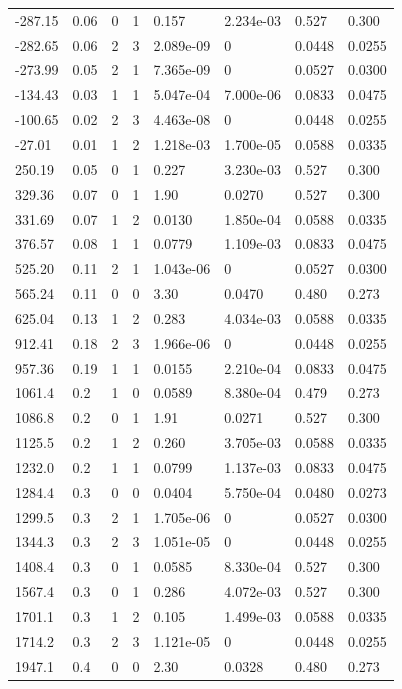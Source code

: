 \documentclass[preview]{standalone}
\begin{document}
{{\begin{tabular}{L{1.2cm}C{1.2cm} C{0.3cm}C{0.5cm} C{1.4cm}C{1.4cm} C{1.4cm}C{1.4cm}}
  -287.15  &  0.06  & 0     &  1 &  0.157  & 2.234e-03  & 0.527 &  0.300   \\ 
  -282.65  &  0.06  & 2     &  3 &  2.089e-09  & 0  & 0.0448 &  0.0255   \\ 
  -273.99  &  0.05  & 2     &  1 &  7.365e-09  & 0  & 0.0527 &  0.0300   \\ 
  -134.43  &  0.03  & 1     &  1 &  5.047e-04  & 7.000e-06  & 0.0833 &  0.0475   \\ 
  -100.65  &  0.02  & 2     &  3 &  4.463e-08  & 0  & 0.0448 &  0.0255   \\ 
  -27.01  &  0.01  & 1     &  2 &  1.218e-03  & 1.700e-05  & 0.0588 &  0.0335   \\ 
  250.19  &  0.05  & 0     &  1 &  0.227  & 3.230e-03  & 0.527 &  0.300   \\ 
  329.36  &  0.07  & 0     &  1 &  1.90  & 0.0270  & 0.527 &  0.300   \\ 
  331.69  &  0.07  & 1     &  2 &  0.0130  & 1.850e-04  & 0.0588 &  0.0335   \\ 
  376.57  &  0.08  & 1     &  1 &  0.0779  & 1.109e-03  & 0.0833 &  0.0475   \\ 
  525.20  &  0.11  & 2     &  1 &  1.043e-06  & 0  & 0.0527 &  0.0300   \\ 
  565.24  &  0.11  & 0     &  0 &  3.30  & 0.0470  & 0.480 &  0.273   \\ 
  625.04  &  0.13  & 1     &  2 &  0.283  & 4.034e-03  & 0.0588 &  0.0335   \\ 
  912.41  &  0.18  & 2     &  3 &  1.966e-06  & 0  & 0.0448 &  0.0255   \\ 
  957.36  &  0.19  & 1     &  1 &  0.0155  & 2.210e-04  & 0.0833 &  0.0475   \\ 
  1061.4  &   0.2  & 1     &  0 &  0.0589  & 8.380e-04  & 0.479 &  0.273   \\ 
  1086.8  &   0.2  & 0     &  1 &  1.91  & 0.0271  & 0.527 &  0.300   \\ 
  1125.5  &   0.2  & 1     &  2 &  0.260  & 3.705e-03  & 0.0588 &  0.0335   \\ 
  1232.0  &   0.2  & 1     &  1 &  0.0799  & 1.137e-03  & 0.0833 &  0.0475   \\ 
  1284.4  &   0.3  & 0     &  0 &  0.0404  & 5.750e-04  & 0.0480 &  0.0273   \\ 
  1299.5  &   0.3  & 2     &  1 &  1.705e-06  & 0  & 0.0527 &  0.0300   \\ 
  1344.3  &   0.3  & 2     &  3 &  1.051e-05  & 0  & 0.0448 &  0.0255   \\ 
  1408.4  &   0.3  & 0     &  1 &  0.0585  & 8.330e-04  & 0.527 &  0.300   \\ 
  1567.4  &   0.3  & 0     &  1 &  0.286  & 4.072e-03  & 0.527 &  0.300   \\ 
  1701.1  &   0.3  & 1     &  2 &  0.105  & 1.499e-03  & 0.0588 &  0.0335   \\ 
  1714.2  &   0.3  & 2     &  3 &  1.121e-05  & 0  & 0.0448 &  0.0255   \\ 
  1947.1  &   0.4  & 0     &  0 &  2.30  & 0.0328  & 0.480 &  0.273   \\ 
\hline 
\end{tabular} 

}}
\end{document}
